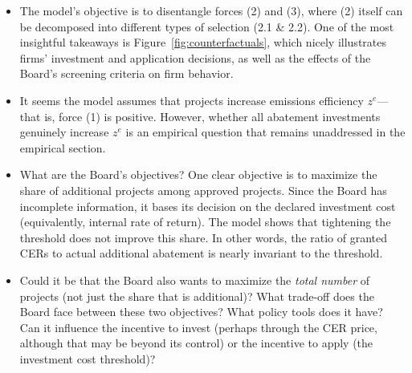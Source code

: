 \documentclass[12pt]{article}[margin=1in]
\begin{document}
\begin{itemize}
    \item The model's objective is to disentangle forces (2) and (3), where (2) itself can be decomposed into different types of selection (2.1 \& 2.2). One of the most insightful takeaways is Figure~\ref{fig:counterfactuals}, which nicely illustrates firms’ investment and application decisions, as well as the effects of the Board's screening criteria on firm behavior.


    \item It seems the model assumes that projects increase emissions efficiency $z^e$—that is, force (1) is positive. However, whether all abatement investments genuinely increase $z^e$ is an empirical question that remains unaddressed in the empirical section.

    \item What are the Board's objectives? One clear objective is to maximize the share of additional projects among approved projects. Since the Board has incomplete information, it bases its decision on the declared investment cost (equivalently, internal rate of return). The model shows that tightening the threshold does not improve this share. In other words, the ratio of granted CERs to actual additional abatement is nearly invariant to the threshold.

    \item Could it be that the Board also wants to maximize the \emph{total number} of projects (not just the share that is additional)? What trade-off does the Board face between these two objectives? What policy tools does it have? Can it influence the incentive to invest (perhaps through the CER price, although that may be beyond its control) or the incentive to apply (the investment cost threshold)?


\end{itemize}
\end{document}
